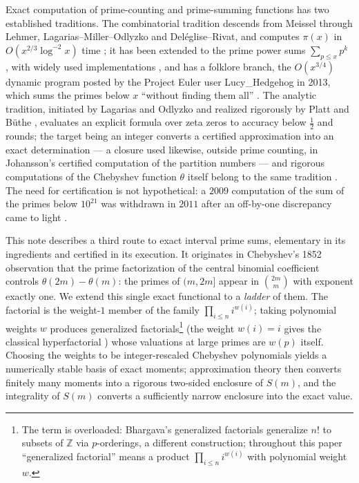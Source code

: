 \documentclass[11pt]{article}
\theoremstyle{remark}
\newcommand{\Z}{\mathbb{Z}}
\begin{document}
Exact computation of prime-counting and prime-summing functions has two established traditions. The
combinatorial tradition descends from Meissel through Lehmer, Lagarias--Miller--Odlyzko and
Del\'eglise--Rivat, and computes $\pi(x)$ in $O(x^{2/3}\log^{-2}x)$ time \cite{DR,Staple}; it has been
extended to the prime power sums $\sum_{p \le x} p^k$ \cite{Orlov}, with widely used implementations
\cite{primesum}, and has a folklore branch, the $O(x^{3/4})$ dynamic program posted by the Project Euler
user Lucy\_Hedgehog in 2013, which sums the primes below $x$ ``without finding them all''
\cite{Lucy}. The analytic tradition, initiated by Lagarias and Odlyzko \cite{LO} and realized
rigorously by Platt \cite{Platt} and B\"uthe \cite{Buthe}, evaluates an explicit formula over zeta
zeros to accuracy below $\tfrac12$ and rounds; the target being an integer converts a certified
approximation into an exact determination --- a closure used likewise, outside prime counting, in
Johansson's certified computation of the partition numbers \cite{JohanssonHRR} --- and rigorous
computations of the Chebyshev function $\theta$ itself belong to the same tradition \cite{PT}. The
need for certification is not hypothetical: a $2009$ computation of the sum of the primes below
$10^{21}$ was withdrawn in $2011$ after an off-by-one discrepancy came to light \cite{primesum}.

This note describes a third route to exact interval prime sums, elementary in its ingredients and
certified in its execution. It originates in Chebyshev's 1852 observation \cite{Cheb} that the prime
factorization of the central binomial coefficient controls $\theta(2m)-\theta(m)$: the primes of
$(m, 2m]$ appear in $\binom{2m}{m}$ with exponent exactly one. We extend this single exact functional to
a \emph{ladder} of them. The factorial is the weight-$1$ member of the family
$\prod_{i \le n} i^{w(i)}$; taking polynomial weights $w$ produces generalized
factorials\footnote{The term is overloaded: Bhargava's generalized factorials \cite{Bhargava}
generalize $n!$ to subsets of $\Z$ via $p$-orderings, a different construction; throughout this paper
``generalized factorial'' means a product $\prod_{i \le n} i^{w(i)}$ with polynomial weight $w$.}
(the weight
$w(i)=i$ gives the classical hyperfactorial \cite{HypVal1,HypVal2}) whose valuations at large primes are
$w(p)$ itself. Choosing the weights to be integer-rescaled Chebyshev polynomials yields a numerically
stable basis of exact moments; approximation theory then converts finitely many moments into a rigorous
two-sided enclosure of $S(m)$, and the integrality of $S(m)$ converts a sufficiently narrow enclosure
into the exact value.
\end{document}
